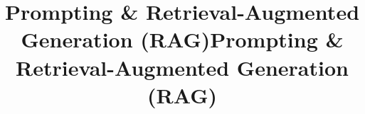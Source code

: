 \documentclass[10pt,aspectratio=169]{beamer}
\title[Prompting & Retrieval-Augmented Generation (RAG)]{Prompting & Retrieval-Augmented Generation (RAG)}
\begin{document}
\title[Prompting & Retrieval-Augmented Generation (RAG)]{Prompting & Retrieval-Augmented Generation (RAG)}



























\end{document}
